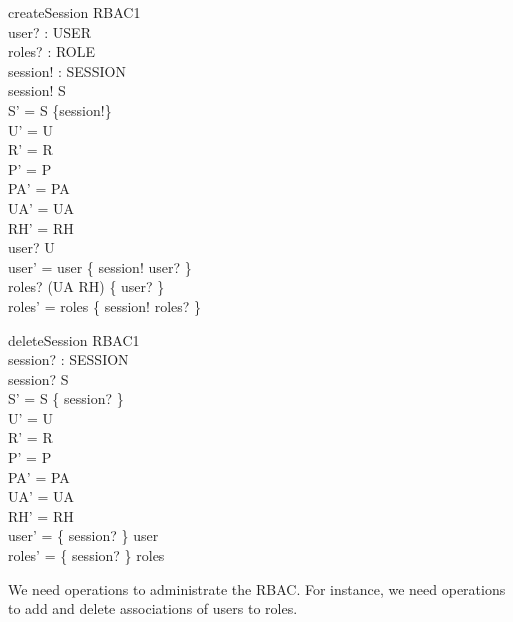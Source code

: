 \begin{zedgroup}
  \begin{schema}{createSession}
    \Delta RBAC1\\
    user? : USER\\
    roles? : \power ROLE\\
    session! : SESSION\\
    \where
    session! \notin S\\
    S'  = S \cup \{session!\}\\
    U'  = U\\
    R'  = R\\
    P'  = P\\
    PA' = PA\\
    UA' = UA\\
    RH' = RH\\
    user? \in U\\
    user' = user \oplus \{ session! \mapsto user? \}\\
    roles? \subseteq  (UA \comp RH) \limg \{ user? \}  \rimg\\
    roles' = roles \oplus \{ session! \mapsto roles? \}\\
  \end{schema}
  \begin{schema}{deleteSession}
    \Delta RBAC1\\
    session? : SESSION\\
    \where
    session? \notin S\\
    S' = S \setminus \{ session? \}\\
    U' = U\\
    R' = R\\
    P' = P\\
    PA' = PA\\
    UA' = UA\\
    RH' = RH\\
    user' = \{ session? \} \ndres user\\
    roles' = \{ session? \} \ndres roles\\
  \end{schema}
\end{zedgroup}
We need operations to administrate the RBAC. For instance, we need operations to
add and delete associations of users to roles.

